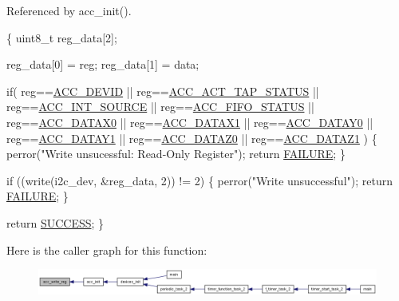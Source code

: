 Referenced by acc\-\_\-init().


\begin{DoxyCode}
\{
  uint8\_t reg\_data[2];

  reg\_data[0] = reg;
  reg\_data[1] = data;

  \textcolor{keywordflow}{if}( reg==\hyperlink{imu__regs_8h_a007fa8d8ef9d89127ae5da32a2f42283}{ACC\_DEVID} || reg==\hyperlink{imu__regs_8h_a823b94e47b6d728fdf91d386d69db3e9}{ACC\_ACT\_TAP\_STATUS} || 
      reg==\hyperlink{imu__regs_8h_a7f9415e11f76d0666b842a875f5f5fd8}{ACC\_INT\_SOURCE} || reg==\hyperlink{imu__regs_8h_acb0760254230c73d4744bae2059e7367}{ACC\_FIFO\_STATUS} ||
      reg==\hyperlink{imu__regs_8h_afae448fbad872220013e5c3abf0f3d9f}{ACC\_DATAX0} || reg==\hyperlink{imu__regs_8h_a63d0e7c719fabce83422ef9856302129}{ACC\_DATAX1} || reg==\hyperlink{imu__regs_8h_a6aa168a0f3e35bfee4da87c32dcb4b46}{ACC\_DATAY0}
       || reg==\hyperlink{imu__regs_8h_a587970363cd2aeb2535ac314e98a2825}{ACC\_DATAY1} || reg==\hyperlink{imu__regs_8h_ab87ce2339aeb4adb7fb71daa80f3bc68}{ACC\_DATAZ0} || reg==\hyperlink{imu__regs_8h_afa9ea1f66d9d28dbb328498d6f7fa43d}{ACC\_DATAZ1}
      )
  \{
      perror(\textcolor{stringliteral}{"Write unsucessful: Read-Only Register"});
      \textcolor{keywordflow}{return} \hyperlink{calibration_2calibration_8h_a6d58f9ac447476b4e084d7ca383f5183}{FAILURE};
  \}
        
  \textcolor{keywordflow}{if} ((write(i2c\_dev, &reg\_data, 2)) != 2) \{             
          perror(\textcolor{stringliteral}{"Write unsuccessful"});
          \textcolor{keywordflow}{return} \hyperlink{calibration_2calibration_8h_a6d58f9ac447476b4e084d7ca383f5183}{FAILURE};
  \}

  \textcolor{keywordflow}{return} \hyperlink{calibration_2calibration_8h_aa90cac659d18e8ef6294c7ae337f6b58}{SUCCESS};
\}
\end{DoxyCode}


Here is the caller graph for this function\-:
\nopagebreak
\begin{figure}[H]
\begin{center}
\leavevmode
\includegraphics[width=350pt]{group__acc_ga534116416343122de29a5b6ade6876bd_icgraph}
\end{center}
\end{figure}


